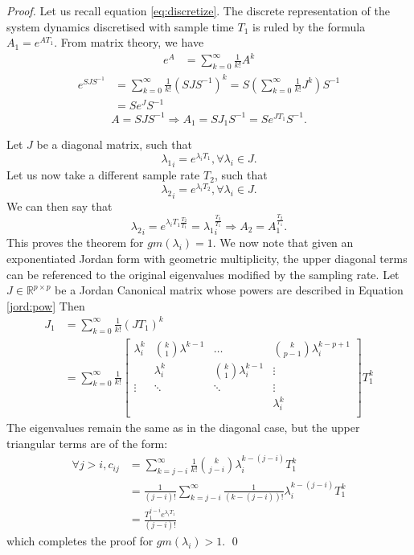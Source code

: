 \documentclass[sigconf]{llncs}
\newcommand{\mat}[1]{{#1}}
\renewcommand{\vec}[1]{{#1}}
\begin{document}
 \begin{proof}
 Let us recall equation \ref{eq:discretize}. The discrete representation of the system dynamics discretised with sample time $T_1$ is ruled by the formula
 $\mat{A}_1 = e^{\mat{A} T_1}$. From matrix theory, we have 
\begin{align}
 e^{\mat{A}}&=\sum_{k=0}^\infty \frac{1}{k!}\mat{A}^k
\end{align} 
\begin{align} 
 e^{\mat{S}\mat{J}\mat{S}^{-1}}&=\sum_{k=0}^\infty \frac{1}{k!}\left(\mat{S}\mat{J}\mat{S}^{-1}\right)^k
 =\mat{S} \left (\sum_{k=0}^\infty \frac{1}{k!}\mat{J}^k\right) \mat{S}^{-1}\nonumber\\
 &=\mat{S}e^{\mat{J}}\mat{S}^{-1}
\end{align} 
\begin{equation}
\mat{A}=\mat{S}\mat{J}\mat{S}^{-1} \Rightarrow \vec{A}_1 = \mat{S}\mat{J}_1\mat{S}^{-1}= \mat{S}e^{\mat{J} T_1}\mat{S}^{-1}.
 \end{equation}
 
 Let $\mat{J}$ be a diagonal matrix, such that 
 $${\lambda_1}_i=e^{\lambda_i T_1}, \forall \lambda_i \in \mat{J}.$$
 Let us now take a different sample rate $T_2$, such that 
 $${\lambda_2}_i=e^{\lambda_i T_2}, \forall \lambda_i \in \mat{J}.$$
 We can then say that 
 \begin{equation}
 {\lambda_2}_i=e^{\lambda_i T_1 \frac{T_2}{T_1}}={\lambda_1}_i^{\frac{T_2}{T_1}} \Rightarrow A_2=A_1^{\frac{T_2}{T_1}}.
 \end{equation}
 This proves the theorem for $gm(\lambda_i)=1$.
 We now note that given an exponentiated Jordan form with geometric multiplicity, the upper diagonal terms can be
 referenced to the original eigenvalues modified by the sampling rate.
  Let $\mat{J}\in \mathbb{R}^{p \times p}$ be a Jordan Canonical matrix whose powers are described in Equation \eqref{jord:pow}
 Then
\begin{align}
 \mat{J}_1&=\sum_{k=0}^\infty \frac{1}{k!}\left(\mat{J}T_1\right)^k\nonumber\\
 &=\sum_{k=0}^\infty \frac{1}{k!} \left [ \begin{array}{cccc}
 \lambda_i^k  & \binom{k}{1}  \lambda^{k-1} & \hdots  & \binom{k}{p-1} \lambda_i^{k-p+1} \\
& \lambda_i^k  & \binom{k}{1}  \lambda_i^{k-1} & \vdots \\
\vdots & \ddots & \ddots & \vdots \\
& &  &\lambda_i^k \\
\end{array} \right ] T_1^k
\end{align}
The eigenvalues remain the same as in the diagonal case, but the upper triangular terms are of the form:
\begin{align}
\forall j>i, c_{ij}&=\sum_{k=j-i}^\infty \frac{1}{k!}\binom{k}{j-i} \lambda_i^{k-(j-i)}T_1^k\\
&=\frac{1}{(j-i)!}\sum_{k=j-i}^\infty \frac{1}{(k-(j-i))!} \lambda_i^{k-(j-i)}T_1^k\nonumber\\
&=\frac{T_1^{j-i}e^{\lambda_i T_1}}{(j-i)!}\nonumber
\end{align}
which completes the proof for $gm(\lambda_i)>1$. \qed
\end{proof}
\end{document}
